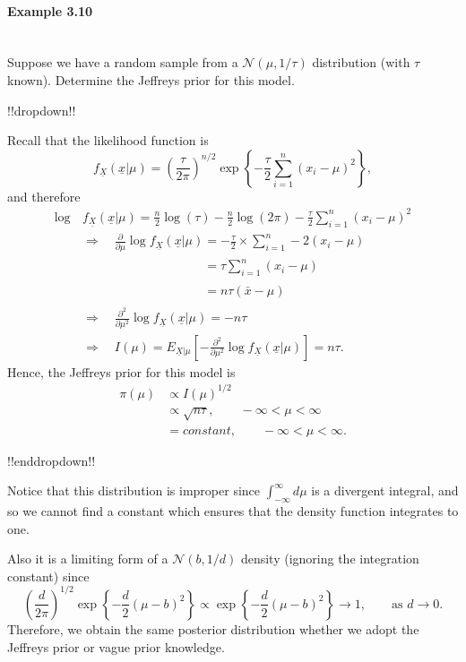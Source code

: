 \clearpage

\paragraph{Example 3.10}{~\\
Suppose we have a random sample from a $\mathcal{N}(\mu,1/\tau)$ distribution  (with $\tau$ known). Determine the Jeffreys prior for this model.

!!dropdown!!

Recall that the likelihood function is
    $$
    f_{\underline{X}}(\underline{x}|\mu)=
    \left(\frac{\tau}{2\pi}\right)^{n/2}
    \exp\left\{-\frac{\tau}{2}\sum_{i=1}^n (x_i-\mu)^2\right\},
    $$
    and therefore 
    \begin{align*}
    \log\,&f_{\underline{X}}(\underline{x}|\mu)=\frac{n}{2}\log(\tau)-\frac{n}{2}\log(2\pi)
    -\frac{\tau}{2}\sum_{i=1}^n (x_i-\mu)^2 \\
    &\Rightarrow\quad \frac{\partial}{\partial\mu} \log
    f_{\underline{X}}(\underline{x}|\mu)=-\frac{\tau}{2}\times\sum_{i=1}^n -2(x_i-\mu)\\
    &\phantom{\Rightarrow\quad \frac{\partial}{\partial\mu} \log f_{\underline{X}}(\underline{x}|\mu)}
    =\tau\sum_{i=1}^n (x_i-\mu) \\
    &\phantom{\Rightarrow\quad \frac{\partial}{\partial\mu} \log f_{\underline{X}}(\underline{x}|\mu)}
    =n\tau(\bar x-\mu)\\
    &\Rightarrow\quad \frac{\partial^2}{\partial\mu^2} \log
    f_{\underline{X}}(\underline{x}|\mu)=-n\tau\\
    &\Rightarrow\quad I(\mu)=E_{\underline{X}|\mu}
    \left[-\frac{\partial^2}{\partial\mu^2} \log
    f_{\underline{X}}(\underline{x}|\mu)\right]=n\tau.
    \end{align*}
    Hence, the Jeffreys prior for this model is
    \begin{align*}
    \pi(\mu)&\propto I(\mu)^{1/2} \\
    &\propto\sqrt{n\tau},\qquad-\infty<\mu<\infty \\
    &= constant,\qquad-\infty<\mu<\infty. 
    \end{align*}

!!enddropdown!!

Notice that this distribution is improper since $\int_{-\infty}^\infty d\mu$ is a divergent integral, and so we cannot find a constant which ensures that the density function integrates to one.

Also it is a limiting form of a $\mathcal{N}(b,1/d)$ density (ignoring the integration constant) since
\begin{equation*}
\left(\frac{d}{2\pi}\right)^{1/2}\exp\left\{-\frac{d}{2}(\mu-b)^2\right\}
\propto
\exp\left\{-\frac{d}{2}(\mu-b)^2\right\}
\to 1,\quad\quad\text{as }d\to 0.
\end{equation*}
Therefore, we obtain the same posterior distribution whether we adopt
the Jeffreys prior or vague prior knowledge.}


